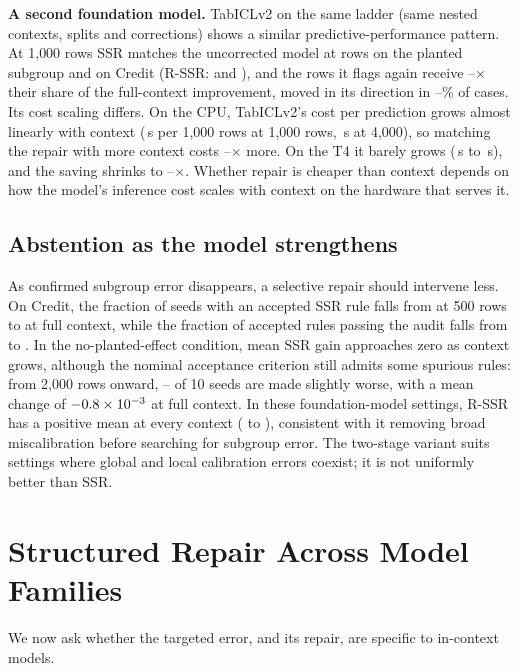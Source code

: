 \documentclass[conference]{IEEEtran}
\begin{document}
\textbf{A second foundation model.} TabICLv2 on the same ladder (same nested contexts, splits and
corrections) shows a similar predictive-performance pattern. At 1{,}000 rows SSR matches the uncorrected model at
\IclPlEqScan{} rows on the planted subgroup and \IclCrEqScan{} on Credit (R-SSR:
\IclPlEqPS{} and \IclCrEqPS), and the rows it flags again receive \IclConcLo--\IclConcHi$\times$ their
share of the full-context improvement, moved in its direction in \IclSignLo--\IclSignHi\% of cases.
Its cost scaling differs. On the CPU, TabICLv2's cost per prediction grows almost linearly with context
(\IclCpuSecOne\,s per 1{,}000 rows at 1{,}000 rows, \IclCpuSecFour\,s at 4{,}000), so matching the
repair with more context costs \IclCrEqScanCpu--\IclPlEqScanCpu$\times$ more. On the T4 it barely grows
(\IclGpuSecOne\,s to \IclGpuSecFour\,s), and the saving shrinks to \IclCrEqScanGpu--\IclPlEqScanGpu$\times$.
Whether repair is cheaper than context depends on how the model's inference cost scales with
context on the hardware that serves it.

\subsection{Abstention as the model strengthens}
As confirmed subgroup error disappears, a selective repair should intervene less. On
Credit, the fraction of seeds with an accepted SSR rule falls from \CrFiveInterv{} at 500 rows to
\CrFullInterv{} at full context, while the fraction of accepted rules passing the audit falls from
\CrFiveAudit{} to \CrFullAudit. In the no-planted-effect condition, mean SSR gain approaches zero
as context grows, although the nominal acceptance criterion still admits some spurious rules: from
2{,}000 rows onward, \NuHarmLo--\NuHarmHi{} of 10 seeds are made slightly worse, with a
mean change of $-0.8\times10^{-3}$ at full context. In these foundation-model settings,
R-SSR has a positive mean at every context (\NuPSMin{} to \NuPSMax), consistent with
it removing broad miscalibration before searching for subgroup error. The two-stage variant suits
settings where global and local calibration errors coexist; it is not uniformly better than SSR.
\section{Structured Repair Across Model Families}\label{sec:general}
We now ask whether the targeted error, and its repair, are specific to in-context models.

\end{document}
